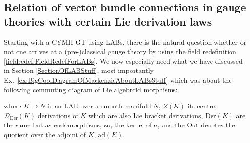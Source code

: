 %
%
\subsection{Relation of vector bundle connections in gauge theories with certain Lie derivation laws} \label{ConnectionIsALieDerivation}

Starting with a CYMH GT using LABs, there is the natural question whether or not one arrives at a (pre-)classical gauge theory by using the field redefinition \ref{fieldredef:FieldRedefForLABs}. We now especially need what we have discussed in Section \ref{SectionOfLABStuff}, most importantly Ex.~\ref{ex:BigCoolDiagramOfMackenzieAboutLABsStuff} which was about the following commuting diagram of Lie algebroid morphisms:
\be\label{theFullDiagramForLABStuff}
\ee
where $K \to N$ is an LAB over a smooth manifold $N$, $Z(K)$ its centre, $\mathcal{D}_{\mathrm{Der}}(K)$ derivations of $K$ which are also Lie bracket derivations, $\mathrm{Der}(K)$ are the same but as endomorphisms, so, the kernel of $a$; and the $\mathrm{Out}$ denotes the quotient over the adjoint of $K$, $\mathrm{ad}(K)$.

